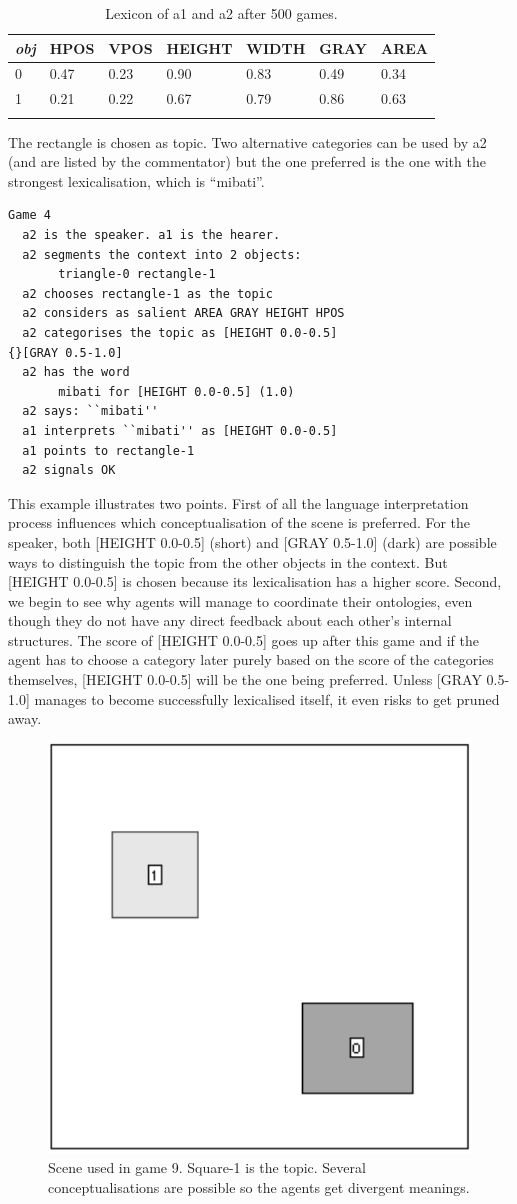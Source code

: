 \begin{table}
\begin{center}
\begin{tabular}{ l  l  l  l  l  l  l }
\lsptoprule
{\itshape obj} & HPOS & VPOS & HEIGHT & WIDTH & GRAY & AREA \\ \midrule
0 & 0.47 & 0.23 & 0.90 & 0.83 & 0.49 & 0.34\\ 
1 & 0.21 & 0.22 & 0.67 & 0.79 & 0.86 & 0.63\\ 
\lspbottomrule
\end{tabular}
\caption{\label{tab:mibati} Lexicon of a1 and a2 after 500 games.}
\end{center}
\end{table}
The rectangle is chosen as topic. Two alternative
categories can be used by {\bfshape  a2} (and are listed
by the commentator) but the one preferred
is the one with the strongest lexicalisation, which is 
``mibati''.
\begin{verbatim}
Game 4
  a2 is the speaker. a1 is the hearer. 
  a2 segments the context into 2 objects: 
       triangle-0 rectangle-1
  a2 chooses rectangle-1 as the topic 
  a2 considers as salient AREA GRAY HEIGHT HPOS 
  a2 categorises the topic as [HEIGHT 0.0-0.5] 
{}[GRAY 0.5-1.0]
  a2 has the word
       mibati for [HEIGHT 0.0-0.5] (1.0)
  a2 says: ``mibati''
  a1 interprets ``mibati'' as [HEIGHT 0.0-0.5]
  a1 points to rectangle-1
  a2 signals OK 
\end{verbatim}

This example illustrates two points. First of all the 
language interpretation process influences 
which conceptualisation of the scene is preferred. For 
the speaker, both [HEIGHT 0.0-0.5] (short) and [GRAY 0.5-1.0]
(dark) are possible ways to distinguish the topic from the 
other objects in the context. But [HEIGHT 0.0-0.5] is 
chosen because its lexicalisation has a higher score. 
Second, we begin to see why agents will manage to 
coordinate their ontologies, even though they do not 
have any direct feedback about each other's internal 
structures. The score of [HEIGHT 0.0-0.5] goes up after
this game and if the 
agent has to choose a category later purely based on 
the score of the categories themselves, [HEIGHT 0.0-0.5] will 
be the one being preferred. Unless [GRAY 0.5-1.0] manages
to become successfully lexicalised itself, it even risks to 
get pruned away. 


\begin{figure}[htbp]
  \centerline{\includegraphics[width=.40\textwidth]{chap6/figs/scene-game9}}
\caption{\label{game9} Scene used
in game 9. Square-1 is the topic. Several conceptualisations are 
possible so the agents get divergent meanings.}
\end{figure}


